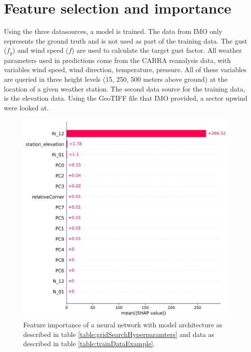 \section{Feature selection and importance}
Using the three datasources, a model is trained. The data from IMO only represents the ground truth and is not used as part of the training data. The gust ($f_g$) and wind speed ($f$) are used to calculate the target gust factor. All weather parameters used in predictions come from the CARRA reanalysis data, with variables wind speed, wind direction, temperature, pressure. All of these variables are queried in three height levels (15, 250, 500 meters above ground) at the location of a given weather station. The second data source for the training data, is the elevation data. Using the GeoTIFF file that IMO provided, a sector upwind were looked at.

\begin{figure}[h]
    \centering
    \includegraphics[scale = 0.6]{Figures/shap_bar_nn_256_example100.png}
    \caption[Feature importance of a neural network.]{Feature importance of a neural network with model architecture as described in table \ref{table:gridSearchHyperparamters} and data as described in table \ref{table:trainDataExample}.}
    \label{fig:ShapleyWaterfallFirstTry}
\end{figure}